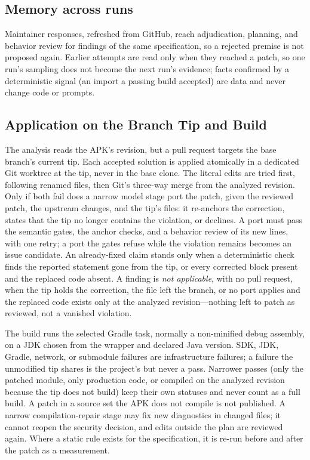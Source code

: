 \documentclass[conference]{IEEEtran}
\begin{document}
\subsection{Memory across runs}

Maintainer responses, refreshed from GitHub, reach adjudication, planning, and
behavior review for findings of the same specification, so a rejected premise
is not proposed again. Earlier attempts are read only when they reached a patch, so one
run's sampling does not become the next run's evidence; facts confirmed by a
deterministic signal (an import a passing build accepted) are data and never
change code or prompts.

\subsection{Application on the Branch Tip and Build}

The analysis reads the APK's revision, but a pull request targets the base
branch's current tip. Each accepted solution is applied atomically in a
dedicated Git worktree at the tip, never in the base clone. The literal edits
are tried first, following renamed files, then Git's three-way merge from the
analyzed revision. Only if both fail does a narrow model stage port the patch,
given the reviewed patch, the upstream changes, and the tip's files: it
re-anchors the correction, states that the tip no longer contains the
violation, or declines. A port must pass the semantic gates, the anchor checks,
and a behavior review of its new lines, with one retry; a port the gates refuse
while the violation remains becomes an issue candidate. An already-fixed claim
stands only when a deterministic check finds the reported statement gone from
the tip, or every corrected block present and the replaced code absent. A
finding is \emph{not applicable}, with no pull request, when the tip holds the
correction, the file left the branch, or no port applies and the replaced code
exists only at the analyzed revision---nothing left to patch as reviewed, not a
vanished violation.

The build runs the selected Gradle task, normally a non-minified debug
assembly, on a JDK chosen from the wrapper and declared Java version. SDK, JDK, Gradle, network,
or submodule failures are infrastructure failures; a failure the unmodified tip
shares is the project's but never a pass. Narrower passes (only the patched
module, only production code, or compiled on the analyzed revision because the
tip does not build) keep their own statuses and never count as a full build. A
patch in a source set the APK does not compile is not published. A narrow
compilation-repair stage may fix new diagnostics in changed files; it cannot
reopen the security decision, and edits outside the plan are reviewed again.
Where a static rule exists for the specification, it is re-run before and after
the patch as a measurement.
\end{document}
